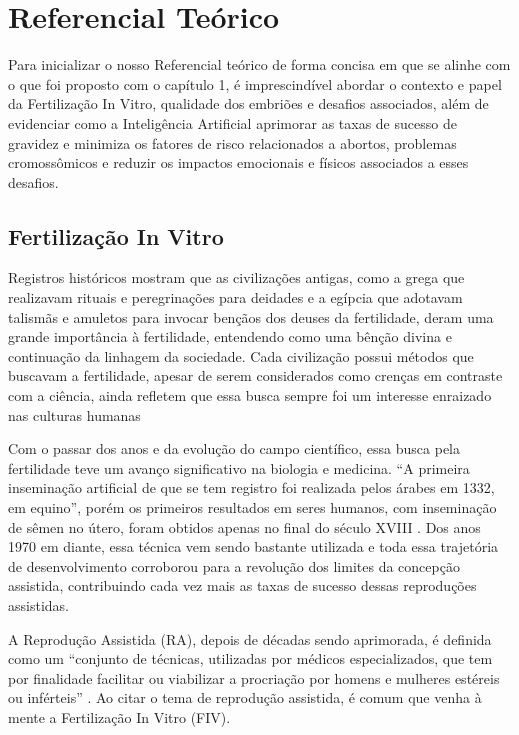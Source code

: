 \chapter[Referencial Teórico]{Referencial Teórico}

Para inicializar o nosso Referencial teórico de forma concisa em que se alinhe com o que foi proposto com o capítulo 1, é imprescindível abordar o contexto e papel da Fertilização In Vitro, qualidade dos embriões e desafios associados, além de evidenciar como a Inteligência Artificial aprimorar as taxas de sucesso de gravidez e minimiza os fatores de risco relacionados a abortos, problemas cromossômicos e reduzir os impactos emocionais e físicos associados a esses desafios.

\section{Fertilização In Vitro}

Registros históricos mostram que as civilizações antigas, como a grega que realizavam rituais e peregrinações para deidades e a egípcia que adotavam talismãs e amuletos para invocar bençãos dos deuses da fertilidade, deram uma grande importância à fertilidade, entendendo como uma bênção divina e continuação da linhagem da sociedade. Cada civilização possui métodos que buscavam a fertilidade, apesar de serem considerados como crenças em contraste com a ciência, ainda refletem que essa busca sempre foi um interesse enraizado nas culturas humanas \cite{moura2020}

Com o passar dos anos e da evolução do campo científico, essa busca pela fertilidade teve um avanço significativo na biologia e medicina. “A primeira inseminação artificial de que se tem registro foi realizada pelos árabes em 1332, em equino”, porém os primeiros resultados em seres humanos, com inseminação de sêmen no útero, foram obtidos apenas no final do século XVIII \cite{moura2020}. Dos anos 1970 em diante, essa técnica vem sendo bastante utilizada e toda essa trajetória de desenvolvimento corroborou para a revolução dos limites da concepção assistida, contribuindo cada vez mais as taxas de sucesso dessas reproduções assistidas.

A Reprodução Assistida (RA), depois de décadas sendo aprimorada, é definida como um “conjunto de técnicas, utilizadas por médicos especializados, que tem por finalidade facilitar ou viabilizar a procriação por homens e mulheres estéreis ou inférteis” \cite{souzamarise2024}. Ao citar o tema de reprodução assistida, é comum que venha à mente a Fertilização In Vitro (FIV).

